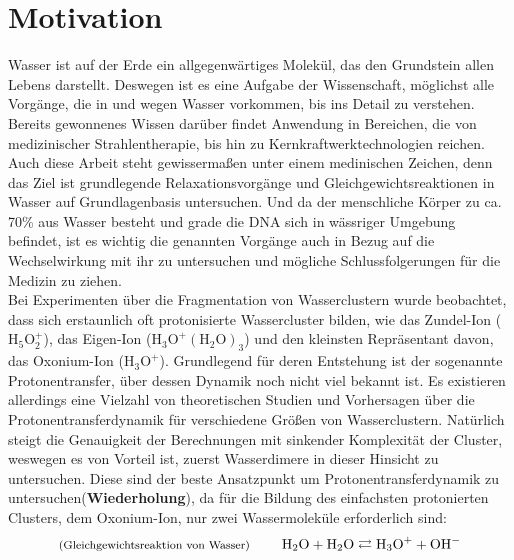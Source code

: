 
  \chapter{Motivation} \label{sec:Motivation}
  
  Wasser ist auf der Erde ein allgegenwärtiges Molekül, das den Grundstein allen Lebens darstellt. Deswegen ist es eine Aufgabe der Wissenschaft, möglichst alle Vorgänge, die in und wegen Wasser vorkommen, bis ins Detail zu verstehen. Bereits gewonnenes Wissen darüber findet Anwendung in Bereichen, die von medizinischer Strahlentherapie, bis hin zu Kernkraftwerktechnologien reichen. 
  Auch diese Arbeit steht gewissermaßen unter einem medinischen Zeichen, denn das Ziel ist grundlegende Relaxationsvorgänge und Gleichgewichtsreaktionen in Wasser auf Grundlagenbasis untersuchen. Und da der menschliche Körper zu ca. 70\% aus Wasser besteht und grade die DNA sich in wässriger Umgebung befindet, ist es wichtig die genannten Vorgänge auch in Bezug auf die Wechselwirkung mit ihr zu untersuchen und mögliche Schlussfolgerungen für die Medizin zu ziehen.\\
  Bei Experimenten über die Fragmentation von Wasserclustern wurde beobachtet, dass sich erstaunlich oft protonisierte Wassercluster bilden, wie das Zundel-Ion ($\mathrm{H_5O_2^+}$), das Eigen-Ion ($\mathrm{H_3O^+(H_2O)_3}$) und den kleinsten Repräsentant davon, das Oxonium-Ion ($\mathrm{H_3O^+}$). Grundlegend für deren Entstehung ist der sogenannte Protonentransfer, über dessen Dynamik noch nicht viel bekannt ist. Es existieren allerdings eine Vielzahl von theoretischen Studien und Vorhersagen über die Protonentransferdynamik für verschiedene Größen von Wasserclustern. Natürlich steigt die Genauigkeit der Berechnungen mit sinkender Komplexität der Cluster, weswegen es von Vorteil ist, zuerst Wasserdimere in dieser Hinsicht zu untersuchen. Diese sind der beste Ansatzpunkt um Protonentransferdynamik zu untersuchen(\textbf{Wiederholung}), da für die Bildung des einfachsten protonierten Clusters, dem Oxonium-Ion, nur zwei Wassermoleküle erforderlich sind:
  \begin{equation}
  \textmd{{\footnotesize(Gleichgewichtsreaktion von Wasser) }}\qquad \textmd{H}_2\textmd{O} + \textmd{H}_2\textmd{O} \rightleftarrows \textmd{H}_3\textmd{O}^+ + \textmd{O}\textmd{H}^- 
  \end{equation} 
  
